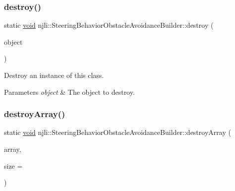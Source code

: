 \subsubsection{\texorpdfstring{destroy()}{destroy()}}
{\footnotesize\ttfamily static \mbox{\hyperlink{_thread_8h_af1e856da2e658414cb2456cb6f7ebc66}{void}} njli\+::\+Steering\+Behavior\+Obstacle\+Avoidance\+Builder\+::destroy (\begin{DoxyParamCaption}\item[{\mbox{\hyperlink{classnjli_1_1_steering_behavior_obstacle_avoidance_builder}{Steering\+Behavior\+Obstacle\+Avoidance\+Builder}} $\ast$}]{object }\end{DoxyParamCaption})\hspace{0.3cm}{\ttfamily [static]}}

Destroy an instance of this class.


\begin{DoxyParams}{Parameters}
{\em object} & The object to destroy. \\
\hline
\end{DoxyParams}
\mbox{\label{classnjli_1_1_steering_behavior_obstacle_avoidance_builder_aee8bf156a385d71d1568c84adaf054b9}} 
\subsubsection{\texorpdfstring{destroy\+Array()}{destroyArray()}}
{\footnotesize\ttfamily static \mbox{\hyperlink{_thread_8h_af1e856da2e658414cb2456cb6f7ebc66}{void}} njli\+::\+Steering\+Behavior\+Obstacle\+Avoidance\+Builder\+::destroy\+Array (\begin{DoxyParamCaption}\item[{\mbox{\hyperlink{classnjli_1_1_steering_behavior_obstacle_avoidance_builder}{Steering\+Behavior\+Obstacle\+Avoidance\+Builder}} $\ast$$\ast$}]{array,  }\item[{const \mbox{\hyperlink{_util_8h_a10e94b422ef0c20dcdec20d31a1f5049}{u32}}}]{size = {} }\end{DoxyParamCaption})\hspace{0.3cm}{\ttfamily [static]}}


